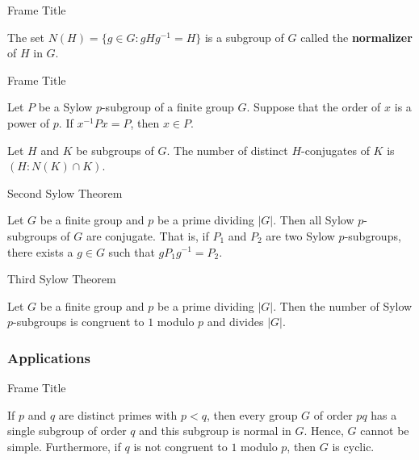 \documentclass{beamer}
\begin{document}
\begin{frame}{Frame Title}
    \begin{definition}
        \justifying
        The set $N(H) = \{g \in G: gHg^{-1} = H\}$ is a subgroup of $G$ called the \textbf{normalizer} of $H$ in $G$.
    \end{definition}
\end{frame}

\begin{frame}{Frame Title}
    \begin{lemma}
        \justifying
        Let $P$ be a Sylow $p$-subgroup of a finite group $G$. Suppose that the order of $x$ is a power of $p$. If $x^{-1}Px = P$, then $x \in P$.  
    \end{lemma}
    \pause
    \begin{lemma}
        \justifying
        Let $H$ and $K$ be subgroups of $G$. The number of distinct $H$-conjugates of $K$ is $(H:N(K)\cap K)$.
    \end{lemma}
\end{frame}

\begin{frame}{Second Sylow Theorem}
    \begin{theorem}
        \justifying
        Let $G$ be a finite group and $p$ be a prime dividing $|G|$. Then all Sylow $p$-subgroups of $G$ are conjugate. That is, if $P_1$ and $P_2$ are two Sylow $p$-subgroups, there exists a $g \in G$ such that $gP_1g^{-1} = P_2$.
    \end{theorem}
\end{frame}

\begin{frame}{Third Sylow Theorem}
    \begin{theorem}
        \justifying
        Let $G$ be a finite group and $p$ be a prime dividing $|G|$. Then the number of Sylow $p$-subgroups is congruent to $1$ modulo $p$ and divides $|G|$.
    \end{theorem}
\end{frame}

\subsubsection{Applications}

\begin{frame}{Frame Title}
    \begin{theorem}
        \justifying
        If $p$ and $q$ are distinct primes with $p < q$, then every group $G$ of order $pq$ has a single subgroup of order $q$ and this subgroup is normal in $G$. Hence, $G$ cannot be simple. Furthermore, if $q$ is not congruent to $1$ modulo $p$, then $G$ is cyclic.
    \end{theorem}
\end{frame}
\end{document}

